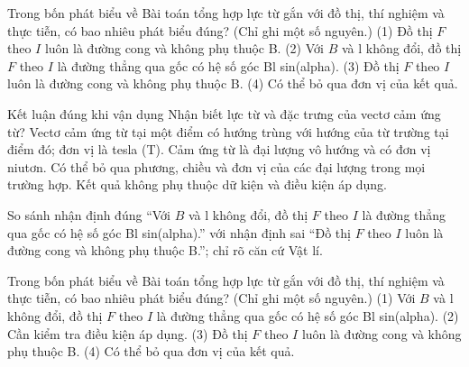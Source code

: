 \begin{ex}
Trong bốn phát biểu về Bài toán tổng hợp lực từ gắn với đồ thị, thí nghiệm và thực tiễn, có bao nhiêu phát biểu đúng? (Chỉ ghi một số nguyên.) (1) Đồ thị $F$ theo $I$ luôn là đường cong và không phụ thuộc B. (2) Với $B$ và l không đổi, đồ thị $F$ theo $I$ là đường thẳng qua gốc có hệ số góc Bl sin(alpha). (3) Đồ thị $F$ theo $I$ luôn là đường cong và không phụ thuộc B. (4) Có thể bỏ qua đơn vị của kết quả.
\end{ex}

\begin{ex}
Kết luận đúng khi vận dụng Nhận biết lực từ và đặc trưng của vectơ cảm ứng từ?
\choice
{\True Vectơ cảm ứng từ tại một điểm có hướng trùng với hướng của từ trường tại điểm đó; đơn vị là tesla (T).}
{Cảm ứng từ là đại lượng vô hướng và có đơn vị niutơn.}
{Có thể bỏ qua phương, chiều và đơn vị của các đại lượng trong mọi trường hợp.}
{Kết quả không phụ thuộc dữ kiện và điều kiện áp dụng.}
\end{ex}

\begin{bt}
So sánh nhận định đúng “Với $B$ và l không đổi, đồ thị $F$ theo $I$ là đường thẳng qua gốc có hệ số góc Bl sin(alpha).” với nhận định sai “Đồ thị $F$ theo $I$ luôn là đường cong và không phụ thuộc B.”; chỉ rõ căn cứ Vật lí.
\end{bt}

\begin{ex}
Trong bốn phát biểu về Bài toán tổng hợp lực từ gắn với đồ thị, thí nghiệm và thực tiễn, có bao nhiêu phát biểu đúng? (Chỉ ghi một số nguyên.) (1) Với $B$ và l không đổi, đồ thị $F$ theo $I$ là đường thẳng qua gốc có hệ số góc Bl sin(alpha). (2) Cần kiểm tra điều kiện áp dụng. (3) Đồ thị $F$ theo $I$ luôn là đường cong và không phụ thuộc B. (4) Có thể bỏ qua đơn vị của kết quả.
\end{ex}

